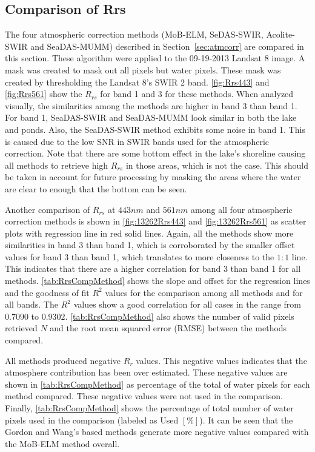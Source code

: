 \documentclass[draft]{spie}  %
\begin{document}
\subsection{Comparison of Rrs}
The four atmospheric correction methods (MoB-ELM, SeDAS-SWIR, Acolite-SWIR and SeaDAS-MUMM) described in Section~\ref{sec:atmcorr} are compared in this section. These algorithm were applied to the 09-19-2013 Landsat 8 image. A mask was created to mask out all pixels but water pixels. These mask was created by thresholding the Landsat 8's SWIR 2 band. \autoref{fig:Rrs443} and \autoref{fig:Rrs561} show the $R_{rs}$ for band 1 and 3 for these methods. When analyzed visually, the similarities among the methods are higher in band 3 than band 1. For band 1, SeaDAS-SWIR and SeaDAS-MUMM look similar in both the lake and ponds. Also, the SeaDAS-SWIR method exhibits some noise in band 1. This is caused due to the low SNR in SWIR bands used for the atmospheric correction. Note that there are some bottom effect in the lake's shoreline causing all methods to retrieve high $R_{rs}$ in those areas, which is not the case. This should be taken in account for future processing by masking the areas where the water are clear to enough that the bottom can be seen.

Another comparison of $R_{rs}$ at $443nm$ and $561nm$ among all four atmospheric correction methods is shown in \autoref{fig:13262Rrs443} and \autoref{fig:13262Rrs561} as scatter plots with regression line in red solid lines. Again, all the methods show more similarities in band 3 than band 1, which is corroborated by the smaller offset values for band 3 than band 1, which translates to more closeness to the $1:1$ line. This indicates that there are a higher correlation for band 3 than band 1 for all methods. \autoref{tab:RrsCompMethod} shows the slope and offset for the regression lines and the goodness of fit $R^2$ values for the comparison among all methods and for all bands. The $R^2$ values show a good correlation for all cases in the range from $0.7090$ to $0.9302$. \autoref{tab:RrsCompMethod} also shows the number of valid pixels retrieved $N$ and the root mean squared error (RMSE) between the methods compared. 

All methods produced negative $R_{r}$ values. This negative values indicates that the atmosphere contribution has been over estimated. These negative values are shown in \autoref{tab:RrsCompMethod} as percentage of the total of water pixels for each method compared. These negative values were not used in the comparison. Finally, \autoref{tab:RrsCompMethod} shows the percentage of total number of water pixels used in the comparison (labeled as Used $[\%]$). It can be seen that the Gordon and Wang's based methods generate more negative values compared with the MoB-ELM method overall. 
\end{document}
